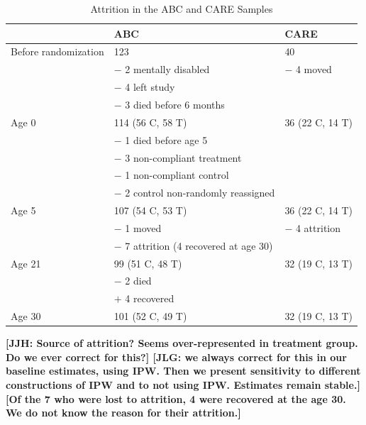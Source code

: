 \documentclass[static]{JJH-Beamer}
\begin{document}
\clearpage


\begin{table}[H]
\caption{Attrition in the ABC and CARE Samples}
\begin{center}
\begin{tabular}{l l l}
\toprule
& ABC & CARE \\
\midrule
Before randomization & 123 & 40 \\
& \quad $-$ 2 mentally disabled & $-$ 4 moved \\
& \quad  $-$ 4 left study & \\
& \quad  $-$ 3 died before 6 months & \\
Age 0 & 114 (56 C, 58 T) &  36 (22 C, 14 T) \\
& \quad  $-$ 1 died before age 5 & \\
& \quad  $-$ 3 non-compliant treatment & \\
& \quad  $-$ 1 non-compliant control & \\
& \quad  $-$ 2 control non-randomly reassigned & \\
 Age 5 & 107 (54 C, 53 T) & 36 (22 C, 14 T) \\
 & \quad  $-$ 1 moved & $-$ 4 attrition \\
 & \quad  $-$ 7 attrition (4 recovered at age 30) & \\
 Age 21 & 99 (51 C, 48 T) & 32 (19 C, 13 T) \\
 & \quad  $-$ 2 died & \\
 & \quad  $+$ 4 recovered & \\
 Age 30 & 101 (52 C, 49 T) & 32 (19 C, 13 T) \\
\bottomrule
\end{tabular}
\end{center}
\end{table}

\textbf{[JJH: Source of attrition? Seems over-represented in treatment group. Do we ever correct for this?] [JLG: we always correct for this in our baseline estimates, using IPW. Then we present sensitivity to different constructions of IPW and to not using IPW. Estimates remain stable.] [Of the 7 who were lost to attrition, 4 were recovered at the age 30. We do not know the reason for their attrition.]}
\end{document}
